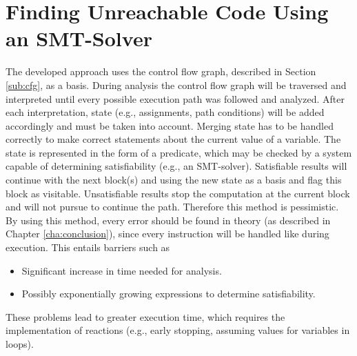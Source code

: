
\chapter{Finding Unreachable Code Using an SMT-Solver}
\label{cha:finding unreachable code using a smt-solver}

The developed approach uses the control flow graph, described in Section \ref{sub:cfg}, as a basis. %
During analysis the control flow graph will be traversed and interpreted until every possible execution path was followed and analyzed.
After each interpretation, state (e.g., assignments, path conditions) will be added accordingly and must be taken into account.
Merging state has to be handled correctly to make correct statements about the current value of a variable.
The state is represented in the form of a predicate, which may be checked by a system capable of determining satisfiability (e.g., an SMT-solver).
Satisfiable results will continue with the next block(s) and using the new state as a basis and flag this block as visitable.
Unsatisfiable results stop the computation at the current block and will not pursue to continue the path.
Therefore this method is pessimistic.
By using this method, every error should be found in theory (as described in Chapter \ref{cha:conclusion}), since every instruction will be handled like during execution. 
This entails barriers such as 
\begin{itemize}
	\item Significant increase in time needed for analysis. 
	\item Possibly exponentially growing expressions to determine satisfiability.
\end{itemize}
These problems lead to greater execution time, which requires the implementation of reactions (e.g., early stopping, assuming values for variables in loops).

